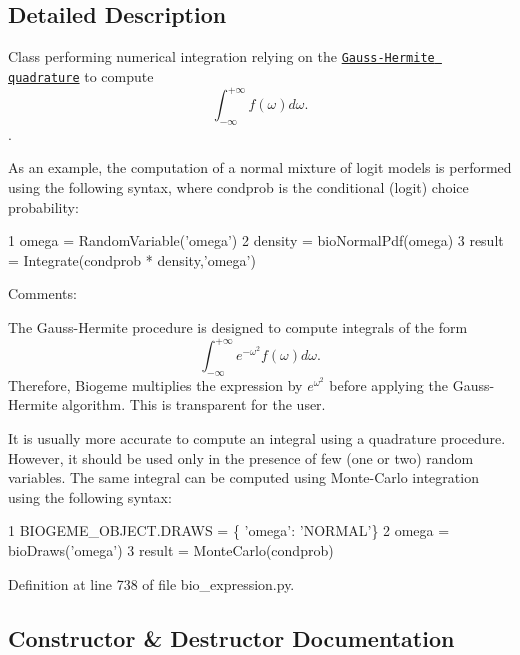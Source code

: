 \subsection{Detailed Description}
Class performing numerical integration relying on the \href{http://en.wikipedia.org/wiki/Gaussian_quadrature}{\tt Gauss-\/\+Hermite quadrature} to compute \[ \int_{-\infty}^{+\infty} f(\omega) d\omega. \]. 

As an example, the computation of a normal mixture of logit models is performed using the following syntax, where condprob is the conditional (logit) choice probability\+: 
\begin{DoxyCode}
1 omega = RandomVariable(\textcolor{stringliteral}{'omega'})
2 density = bioNormalPdf(omega) 
3 result = Integrate(condprob * density,\textcolor{stringliteral}{'omega'})
\end{DoxyCode}
 Comments\+:
\begin{DoxyItemize}
\item The Gauss-\/\+Hermite procedure is designed to compute integrals of the form \[ \int_{-\infty}^{+\infty} e^{-\omega^2} f(\omega) d\omega. \] Therefore, Biogeme multiplies the expression by $e^{\omega^2}$ before applying the Gauss-\/\+Hermite algorithm. This is transparent for the user.
\end{DoxyItemize}

It is usually more accurate to compute an integral using a quadrature procedure. However, it should be used only in the presence of few (one or two) random variables. The same integral can be computed using Monte-\/\+Carlo integration using the following syntax\+: 
\begin{DoxyCode}
1 BIOGEME\_OBJECT.DRAWS = \{ \textcolor{stringliteral}{'omega'}: \textcolor{stringliteral}{'NORMAL'}\}
2 omega = bioDraws(\textcolor{stringliteral}{'omega'})
3 result = MonteCarlo(condprob)
\end{DoxyCode}
 

Definition at line 738 of file bio\+\_\+expression.\+py.



\subsection{Constructor \& Destructor Documentation}
